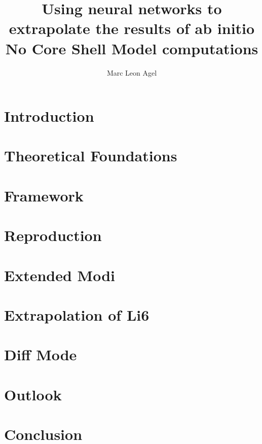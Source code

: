 






\title{Using neural networks to extrapolate the results of
  ab initio No Core Shell Model computations}
\author{Marc Leon Agel}
\reviewer{ }


\submissiondate{\today}
\examdate{\today}

\maketitle

\affidavit

\tableofcontents

\chapter{Introduction}


\chapter{Theoretical Foundations}


\chapter{Framework}


\chapter{Reproduction}


\chapter{Extended Modi}


\chapter{Extrapolation of Li6}



\chapter{Diff Mode}


\chapter{Outlook}


\chapter{Conclusion}



\printbibliography

